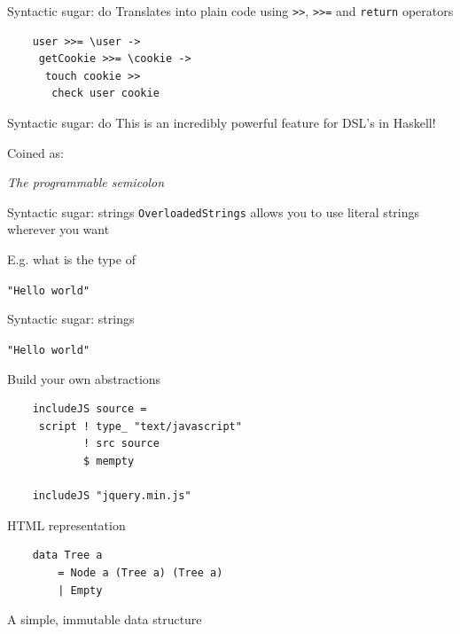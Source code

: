 \documentclass[20pt]{beamer}
\newcommand{\vspaced}{
    \vspace{5mm}
}
\begin{document}
\begin{frame}[fragile]{Syntactic sugar: do}
    Translates into plain code using \texttt{>>}, \texttt{>>=}
    and \texttt{return} operators
    \vspaced
    \begin{lstlisting}
    user >>= \user ->
     getCookie >>= \cookie ->
      touch cookie >>
       check user cookie
    \end{lstlisting}
\end{frame}

\begin{frame}[fragile]{Syntactic sugar: do}
    This is an incredibly powerful feature for DSL's in Haskell! \\
    \vspaced
    Coined as: \\
    \vspaced
    \large{\textit{The programmable semicolon}}
\end{frame}

\begin{frame}[fragile]{Syntactic sugar: strings}
    \texttt{OverloadedStrings} allows you to use literal strings wherever you
    want \\
    \vspaced
    E.g. what is the type of
    \begin{center}
    \large{\texttt{"Hello world"}}
    \end{center}
\end{frame}

\begin{frame}{Syntactic sugar: strings}
    \begin{center}
    \large{\texttt{"Hello world"}}
    \end{center}
\end{frame}

\begin{frame}[fragile]{Build your own abstractions}
    \begin{lstlisting}
    includeJS source =
     script ! type_ "text/javascript"
            ! src source
            $ mempty

    includeJS "jquery.min.js"
    \end{lstlisting}
\end{frame}

\begin{frame}[fragile]{HTML representation}
    \begin{lstlisting}
    data Tree a
        = Node a (Tree a) (Tree a)
        | Empty
    \end{lstlisting}
    \vspaced
    A simple, immutable data structure
\end{frame}
\end{document}
